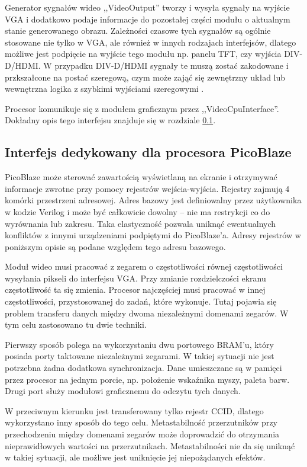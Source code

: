 Generator sygnałów wideo ,,VideoOutput'' tworzy i wysyła sygnały na wyjście VGA i dodatkowo podaje informacje do pozostałej części modułu o aktualnym stanie generowanego obrazu. Zależności czasowe tych sygnałów są ogólnie stosowane nie tylko w VGA, ale również w innych rodzajach interfejsów, dlatego możliwe jest podpięcie na wyjście tego modułu np. panelu TFT, czy wyjścia DIV-D/HDMI. W przypadku DIV-D/HDMI sygnały te muszą zostać zakodowane i przkszałcone na postać szeregową, czym może zająć się zewnętrzny układ lub wewnętrzna logika z szybkimi wyjściami szeregowymi \cite{XAPP495}.

Procesor komunikuje się z modułem graficznym przez ,,VideoCpuInterface''. Dokładny opis tego interfejsu znajduje się w rozdziale \ref{InterfaceVideo}.


\subsection{Interfejs dedykowany dla procesora PicoBlaze}
\label{InterfaceVideo}


PicoBlaze może sterować zawartością wyświetlaną na ekranie i otrzymywać informacje zwrotne przy pomocy rejestrów wejścia-wyjścia. Rejestry zajmują 4 komórki przestrzeni adresowej. Adres bazowy jest definiowalny przez użytkownika w kodzie Verilog i może być całkowicie dowolny -- nie ma restrykcji co do wyrównania lub zakresu. Taka elastyczność pozwala uniknąć ewentualnych konfliktów z innymi urządzeniami podpiętymi do PicoBlaze'a. Adresy rejestrów w poniższym opisie są podane względem tego adresu bazowego.


Moduł wideo musi pracować z zegarem o częstotliwości równej częstotliwości wysyłania pikseli do interfejsu VGA. Przy zmianie rozdzielczości ekranu częstotliwość ta się zmienia. Procesor najczęściej musi pracować w innej częstotliwości, przystosowanej do zadań, które wykonuje. Tutaj pojawia się problem transferu danych między dwoma niezależnymi domenami zegarów. W tym celu zastosowano tu dwie techniki.

Pierwszy sposób polega na wykorzystaniu dwu portowego BRAM'u, który posiada porty taktowane niezależnymi zegarami. W takiej sytuacji nie jest potrzebna żadna dodatkowa synchronizacja. Dane umieszczane są w pamięci przez procesor na jednym porcie, np. położenie wskaźnika myszy, paleta barw. Drugi port służy modułowi graficznemu do odczytu tych danych.

W przeciwnym kierunku jest transferowany tylko rejestr CCID, dlatego wykorzystano inny sposób do tego celu. Metastabilność przerzutników przy przechodzeniu między domenami zegarów może doprowadzić do otrzymania nieprawidłowych wartości na przerzutnikach. Metastabilności nie da się uniknąć w takiej sytuacji, ale możliwe jest uniknięcie jej niepożądanych efektów.

